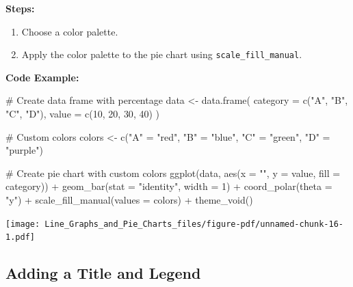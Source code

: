 \documentclass[
  letterpaper,
  DIV=11,
  numbers=noendperiod]{scrreprt}
\newenvironment{Shaded}{\begin{snugshade}}{\end{snugshade}}
\newcommand{\AttributeTok}[1]{\textcolor[rgb]{0.40,0.45,0.13}{#1}}
\newcommand{\CommentTok}[1]{\textcolor[rgb]{0.37,0.37,0.37}{#1}}
\newcommand{\DecValTok}[1]{\textcolor[rgb]{0.68,0.00,0.00}{#1}}
\newcommand{\FunctionTok}[1]{\textcolor[rgb]{0.28,0.35,0.67}{#1}}
\newcommand{\NormalTok}[1]{\textcolor[rgb]{0.00,0.23,0.31}{#1}}
\newcommand{\OtherTok}[1]{\textcolor[rgb]{0.00,0.23,0.31}{#1}}
\newcommand{\SpecialCharTok}[1]{\textcolor[rgb]{0.37,0.37,0.37}{#1}}
\newcommand{\StringTok}[1]{\textcolor[rgb]{0.13,0.47,0.30}{#1}}
\providecommand{\tightlist}{%
  \setlength{\itemsep}{0pt}\setlength{\parskip}{0pt}}\usepackage{longtable,booktabs,array}
\begin{document}
\textbf{Steps:}

\begin{enumerate}
\def\labelenumi{\arabic{enumi}.}
\tightlist
\item
  Choose a color palette.
\item
  Apply the color palette to the pie chart using
  \texttt{scale\_fill\_manual}.
\end{enumerate}

\textbf{Code Example:}

\begin{Shaded}
\begin{Highlighting}[]
\CommentTok{\# Create data frame with percentage}
\NormalTok{data }\OtherTok{\textless{}{-}} \FunctionTok{data.frame}\NormalTok{(}
  \AttributeTok{category =} \FunctionTok{c}\NormalTok{(}\StringTok{"A"}\NormalTok{, }\StringTok{"B"}\NormalTok{, }\StringTok{"C"}\NormalTok{, }\StringTok{"D"}\NormalTok{),}
  \AttributeTok{value =} \FunctionTok{c}\NormalTok{(}\DecValTok{10}\NormalTok{, }\DecValTok{20}\NormalTok{, }\DecValTok{30}\NormalTok{, }\DecValTok{40}\NormalTok{)}
\NormalTok{)}

\CommentTok{\# Custom colors}
\NormalTok{colors }\OtherTok{\textless{}{-}} \FunctionTok{c}\NormalTok{(}\StringTok{"A"} \OtherTok{=} \StringTok{"red"}\NormalTok{, }\StringTok{"B"} \OtherTok{=} \StringTok{"blue"}\NormalTok{, }\StringTok{"C"} \OtherTok{=} \StringTok{"green"}\NormalTok{, }\StringTok{"D"} \OtherTok{=} \StringTok{"purple"}\NormalTok{)}

\CommentTok{\# Create pie chart with custom colors}
\FunctionTok{ggplot}\NormalTok{(data, }\FunctionTok{aes}\NormalTok{(}\AttributeTok{x =} \StringTok{""}\NormalTok{, }\AttributeTok{y =}\NormalTok{ value, }\AttributeTok{fill =}\NormalTok{ category)) }\SpecialCharTok{+}
  \FunctionTok{geom\_bar}\NormalTok{(}\AttributeTok{stat =} \StringTok{"identity"}\NormalTok{, }\AttributeTok{width =} \DecValTok{1}\NormalTok{) }\SpecialCharTok{+}
  \FunctionTok{coord\_polar}\NormalTok{(}\AttributeTok{theta =} \StringTok{"y"}\NormalTok{) }\SpecialCharTok{+}
  \FunctionTok{scale\_fill\_manual}\NormalTok{(}\AttributeTok{values =}\NormalTok{ colors) }\SpecialCharTok{+}
  \FunctionTok{theme\_void}\NormalTok{()}
\end{Highlighting}
\end{Shaded}

\texttt{[image: Line\_Graphs\_and\_Pie\_Charts\_files/figure-pdf/unnamed-chunk-16-1.pdf]}

\subsection*{Adding a Title and Legend}\label{adding-a-title-and-legend}
\end{document}
